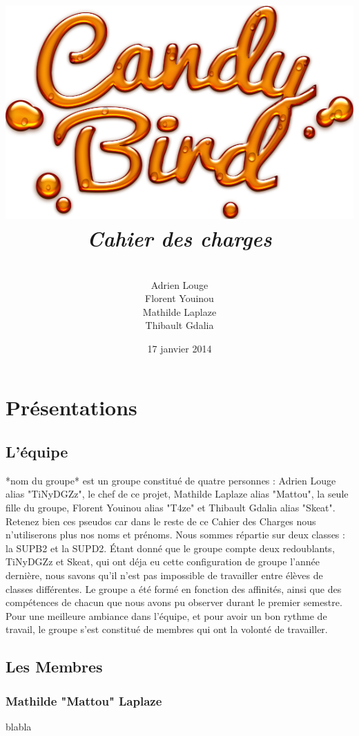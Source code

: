 \documentclass [11pt]{report}
\title{
	\includegraphics[scale=0.43]{images/Logojeu.png}
	 \\\vspace{20mm}
	\textbf{\Huge \itshape Cahier des charges }
	}
\author{ \\\vspace{2mm}
	Adrien Louge \\\vspace{2mm}
	Florent Youinou\\\vspace{2mm}
	Mathilde Laplaze\\\vspace{2mm}
	Thibault Gdalia\\\vspace{30mm}
	}
\date{17 janvier 2014}
\begin{document}
\renewcommand{\baselinestretch}{0.001}
\maketitle
\tableofcontents

\newpage
\chapter {Pr\'esentations}

	\section{ L'\'equipe }

		*nom du groupe* est  un groupe constitué de quatre personnes : Adrien Louge alias "TiNyDGZz", le chef de ce projet, Mathilde Laplaze alias "Mattou", la seule fille du groupe, Florent Youinou alias "T4ze" et Thibault Gdalia alias "Skeat". Retenez bien ces pseudos car dans le reste de ce Cahier des Charges nous n'utiliserons plus nos noms et pr\'enoms. Nous sommes r\'epartie sur deux classes : la SUPB2 et la SUPD2.  \'Etant donné que le groupe compte deux redoublants, TiNyDGZz et Skeat, qui ont d\'eja eu cette configuration de groupe l'ann\'ee derni\`ere, nous savons qu'il n'est pas impossible de travailler entre \'el\`eves de classes diff\'erentes. Le groupe a \'et\'e form\'e en fonction des affinit\'es, ainsi que des comp\'etences de chacun que nous avons pu observer durant le premier semestre. Pour une meilleure ambiance dans l'\'equipe, et pour avoir un bon rythme de travail, le groupe s'est constitué de membres qui ont la volont\'e de travailler. 
	
	
	
	\newpage

	\section { Les Membres }
		\subsection {Mathilde "Mattou" Laplaze}
			blabla\\\vspace{10mm}
	
		
\end{document}

